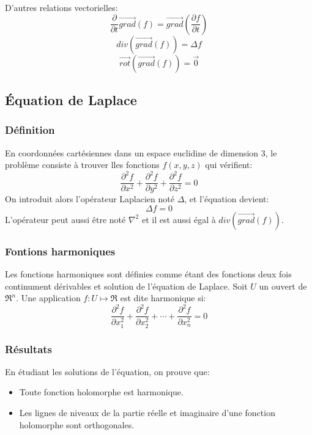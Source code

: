 \documentclass[10pt,a4paper]{article}
\begin{document}
D'autres relations vectorielles:
\begin{equation}
\frac{\partial}{\partial t}\overrightarrow{grad}(f) = \overrightarrow{grad}(\frac{\partial f}{\partial t})
\end{equation}
\begin{equation}
div(\overrightarrow{grad}(f)) = \Delta f
\end{equation}
\begin{equation}
\overrightarrow{rot}(\overrightarrow{grad}(f)) = \overrightarrow{0}
\end{equation}


\subsection{Équation de Laplace \cite{eqlaplace}}
\subsubsection{Définition}
En coordonnées cartésiennes dans un espace euclidine de dimension 3, le problème consiste à trouver lles fonctions $f(x,y,z)$ qui vérifient:
\begin{equation}
\frac{\partial^{2} f}{\partial x^{2}} + \frac{\partial^{2} f}{\partial y^{2}} + \frac{\partial^{2} f}{\partial z^{2}} = 0
\end{equation}
On introduit alors l'opérateur Laplacien noté $\Delta$, et l'équation devient:
\begin{equation}
\Delta f = 0
\end{equation}
L'opérateur peut aussi être noté $\nabla^{2}$ et il est aussi égal à $div(\overrightarrow{grad}(f))$.

\subsubsection{Fontions harmoniques \cite{fharmonique}}
Les fonctions harmoniques sont définies comme étant des fonctions deux fois continument dérivables et solution de l'équation de Laplace. Soit $U$ un ouvert de $\Re^{n}$. Une application $f : U \mapsto \Re$ est dite harmonique si:
\begin{equation}
\frac{\partial^{2} f}{\partial x_{1}^{2}} + \frac{\partial^{2} f}{\partial x_{2}^{2}} + \dotsb + \frac{\partial^{2} f}{\partial x_{n}^{2}} = 0
\end{equation}

\subsubsection{Résultats}
En étudiant les solutions de l'équation, on prouve que:
\begin{itemize}
\item Toute fonction holomorphe\cite{fholomorphe} est harmonique.
\item Les lignes de niveaux\cite{ligneniveau} de la partie réelle et imaginaire d'une fonction holomorphe sont orthogonales.
\end{itemize}
\end{document}
